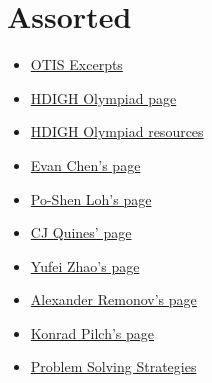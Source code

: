 \section{Assorted}
\begin{itemize}
  \item \href{https://web.evanchen.cc/textbooks/OTIS-Excerpts.pdf}{OTIS
      Excerpts}
  \item \href{https://how-did-i-get-here.com/olympiad/}{HDIGH Olympiad page}
  \item \href{https://how-did-i-get-here.com/olympiad-resources/}{HDIGH Olympiad
      resources}
  \item \href{https://web.evanchen.cc/olympiad.html}{Evan Chen's page}
  \item \href{https://www.math.cmu.edu/~ploh/olympiad.shtml}{Po-Shen Loh's page}
  \item \href{https://cjquines.com/math/competition-handouts}{CJ Quines' page}
  \item \href{https://yufeizhao.com/olympiad/}{Yufei Zhao's page}
  \item \href{https://alexanderrem.weebly.com/math-competitions.html}{Alexander
      Remonov's page}
  \item \href{https://www.its.caltech.edu/~kpilch/olympiad.html}{Konrad Pilch's
      page}
  \item
    \href{https://archive.org/download/ProblemSolvingStrategies/Problem\%20Solving\%20Strategies.pdf}
    {Problem Solving Strategies}
\end{itemize}
